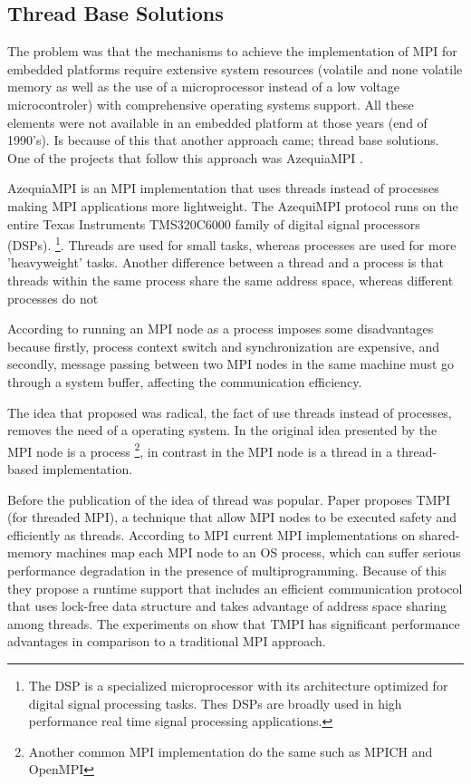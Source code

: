 
\subsection{Thread Base Solutions}

The problem was that the mechanisms to achieve the implementation of MPI for
embedded platforms require extensive system resources (volatile and none
volatile memory as well as the use of a microprocessor instead of a low voltage
microcontroler) with comprehensive operating systems support. All these
elements were not available in an embedded platform at those years (end of
1990's). Is because of this that another approach came; thread base solutions.
One of the projects that follow this approach was AzequiaMPI \cite{Gallego}.

AzequiaMPI is an MPI implementation that uses threads instead of processes
making MPI applications more lightweight. The AzequiMPI protocol runs on the
entire Texas Instruments TMS320C6000 family of digital signal processors
(DSPs). \footnote{The DSP is a specialized microprocessor
with its architecture optimized for digital signal processing tasks. Thes DSPs
are broadly used in high performance real time signal processing
applications.}. Threads are used for small tasks, whereas processes are used
for more 'heavyweight' tasks. Another
difference between a thread and a process is that threads within the same
process share the same address space, whereas different processes do not

According to \cite{Gallego} running an MPI node as a process imposes some
disadvantages because firstly, process context switch and synchronization are
expensive, and secondly, message passing between two MPI nodes in the same
machine must go through a system buffer, affecting  the communication
efficiency. 

The idea that \cite{Gallego} proposed was radical, the fact of use threads
instead of processes, removes the need of a operating system. In the original
idea presented by \cite{Salim} the MPI node  is a process \footnote{Another
common  MPI implementation do the same such as MPICH and OpenMPI},  in contrast
in \cite{Gallego} the MPI node is a thread in a thread-based implementation.

Before the publication of \cite{Gallego} the idea of thread was popular.
Paper \cite{Tang} proposes TMPI (for threaded MPI), a technique that  allow MPI
nodes to be executed safety and efficiently as threads. According to
\cite{Tang} MPI current MPI implementations on shared-memory machines map each
MPI node to an OS process, which can suffer serious performance degradation in
the presence of multiprogramming. Because of this they propose a runtime
support that includes an efficient communication protocol that uses lock-free
data structure and takes advantage of address space sharing among threads. The
experiments on \cite{Tang} show that TMPI has significant performance
advantages in comparison to a traditional MPI approach.

